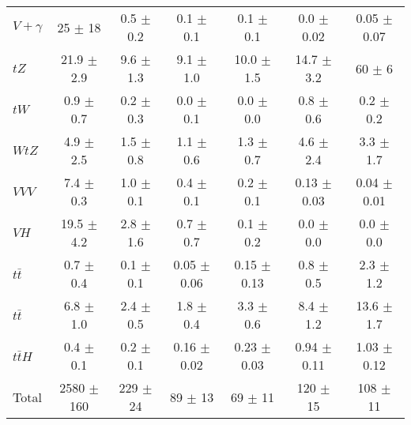 \begin{tabular}{|l|c|c|c|c|c|c|}
  $V+\gamma$   & 25 $\pm$ 18 & 0.5 $\pm$ 0.2 & 0.1 $\pm$ 0.1 & 0.1 $\pm$ 0.1 & 0.0 $\pm$ 0.02 & 0.05 $\pm$ 0.07 \\ 
  $tZ$   & 21.9 $\pm$ 2.9 & 9.6 $\pm$ 1.3 & 9.1 $\pm$ 1.0 & 10.0 $\pm$ 1.5 & 14.7 $\pm$ 3.2 & 60 $\pm$ 6 \\ 
  $tW$   & 0.9 $\pm$ 0.7 & 0.2 $\pm$ 0.3 & 0.0 $\pm$ 0.1 & 0.0 $\pm$ 0.0 & 0.8 $\pm$ 0.6 & 0.2 $\pm$ 0.2 \\ 
  $WtZ$   & 4.9 $\pm$ 2.5 & 1.5 $\pm$ 0.8 & 1.1 $\pm$ 0.6 & 1.3 $\pm$ 0.7 & 4.6 $\pm$ 2.4 & 3.3 $\pm$ 1.7 \\ 
  $VVV$   & 7.4 $\pm$ 0.3 & 1.0 $\pm$ 0.1 & 0.4 $\pm$ 0.1 & 0.2 $\pm$ 0.1 & 0.13 $\pm$ 0.03 & 0.04 $\pm$ 0.01 \\ 
  $VH$   & 19.5 $\pm$ 4.2 & 2.8 $\pm$ 1.6 & 0.7 $\pm$ 0.7 & 0.1 $\pm$ 0.2 & 0.0 $\pm$ 0.0 & 0.0 $\pm$ 0.0 \\ 
  $t\bar{t}$   & 0.7 $\pm$ 0.4 & 0.1 $\pm$ 0.1 & 0.05 $\pm$ 0.06 & 0.15 $\pm$ 0.13 & 0.8 $\pm$ 0.5 & 2.3 $\pm$ 1.2 \\ 
  $t\bar{t}$   & 6.8 $\pm$ 1.0 & 2.4 $\pm$ 0.5 & 1.8 $\pm$ 0.4 & 3.3 $\pm$ 0.6 & 8.4 $\pm$ 1.2 & 13.6 $\pm$ 1.7 \\ 
  $t\bar{t}H$   & 0.4 $\pm$ 0.1 & 0.2 $\pm$ 0.1 & 0.16 $\pm$ 0.02 & 0.23 $\pm$ 0.03 & 0.94 $\pm$ 0.11 & 1.03 $\pm$ 0.12 \\ 
\hline 
  Total  & 2580 $\pm$ 160 & 229 $\pm$ 24 & 89 $\pm$ 13 & 69 $\pm$ 11 & 120 $\pm$ 15 & 108 $\pm$ 11 \\ 
\hline 
\end{tabular} 
